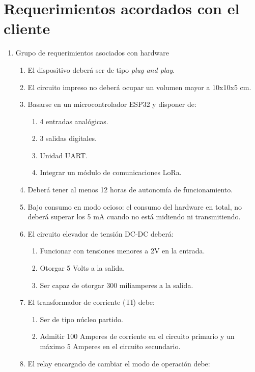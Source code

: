 \section{Requerimientos acordados con el cliente}
\label{sec:requerimientos}
\begin{enumerate}
	\item Grupo de requerimientos asociados con hardware
	\begin{enumerate}
		\item El dispositivo deberá ser de tipo \textit{plug and play}.
		\item El circuito impreso no deberá ocupar un volumen mayor a 10x10x5 cm.
		\item Basarse en un microcontrolador ESP32 y disponer de:
		\begin{enumerate}%
			\item 4 entradas analógicas.
			\item 3 salidas digitales.
			\item Unidad UART.
			\item Integrar un módulo de comunicaciones LoRa.
		\end{enumerate}
		\item Deberá tener al menos 12 horas de autonomía de funcionamiento.
		\item Bajo consumo en modo ocioso: el consumo del hardware en total, no deberá superar los 5 mA cuando no está midiendo ni transmitiendo.
		\item El circuito elevador de tensión DC-DC deberá:
		\begin{enumerate}%
			\item Funcionar con tensiones menores a 2V en la entrada.
			\item Otorgar 5 Volts a la salida.
			\item Ser capaz de otorgar 300 miliamperes a la salida.
		\end{enumerate}
		\item El transformador de corriente (TI) debe:
		\begin{enumerate}%
			\item Ser de tipo núcleo partido.
			\item Admitir 100 Amperes de corriente en el circuito primario y un máximo 5 Amperes en el circuito secundario.
		\end{enumerate}
		\item \label{req_relay} El relay encargado de cambiar el modo de operación debe:
		\begin{enumerate}%

\end{enumerate}
\end{enumerate}
\end{enumerate}
